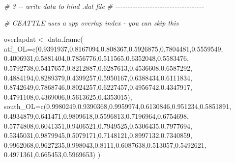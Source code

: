 \documentclass[
]{article}
\newenvironment{Shaded}{\begin{snugshade}}{\end{snugshade}}
\newcommand{\AttributeTok}[1]{\textcolor[rgb]{0.77,0.63,0.00}{#1}}
\newcommand{\CommentTok}[1]{\textcolor[rgb]{0.56,0.35,0.01}{\textit{#1}}}
\newcommand{\FloatTok}[1]{\textcolor[rgb]{0.00,0.00,0.81}{#1}}
\newcommand{\FunctionTok}[1]{\textcolor[rgb]{0.00,0.00,0.00}{#1}}
\newcommand{\NormalTok}[1]{#1}
\newcommand{\OtherTok}[1]{\textcolor[rgb]{0.56,0.35,0.01}{#1}}
\begin{document}
\begin{Shaded}
\begin{Highlighting}[]
   \CommentTok{\# 3 {-}{-} write data to hind .dat file}
   \CommentTok{\# {-}{-}{-}{-}{-}{-}{-}{-}{-}{-}{-}{-}{-}{-}{-}{-}{-}{-}{-}{-}{-}{-}{-}{-}{-}{-}{-}{-}{-}{-}{-}{-}{-}{-}{-}{-}}
      
         
      \CommentTok{\# CEATTLE uses a spp overlap index {-} you can skip this}
          
\NormalTok{                overlapdat }\OtherTok{\textless{}{-}} \FunctionTok{data.frame}\NormalTok{(}
                    \AttributeTok{atf\_OL=}\FunctionTok{c}\NormalTok{(}\FloatTok{0.9391937}\NormalTok{,}\FloatTok{0.8167094}\NormalTok{,}\FloatTok{0.808367}\NormalTok{,}\FloatTok{0.5926875}\NormalTok{,}\FloatTok{0.7804481}\NormalTok{,}\FloatTok{0.5559549}\NormalTok{,}
                             \FloatTok{0.4006931}\NormalTok{,}\FloatTok{0.5881404}\NormalTok{,}\FloatTok{0.7856776}\NormalTok{,}\FloatTok{0.511565}\NormalTok{,}\FloatTok{0.6352048}\NormalTok{,}\FloatTok{0.5583476}\NormalTok{,}
                             \FloatTok{0.5792738}\NormalTok{,}\FloatTok{0.5417657}\NormalTok{,}\FloatTok{0.8212887}\NormalTok{,}\FloatTok{0.6287613}\NormalTok{,}\FloatTok{0.4536608}\NormalTok{,}\FloatTok{0.6587292}\NormalTok{,}
                             \FloatTok{0.4884194}\NormalTok{,}\FloatTok{0.8289379}\NormalTok{,}\FloatTok{0.4399257}\NormalTok{,}\FloatTok{0.5950167}\NormalTok{,}\FloatTok{0.6388434}\NormalTok{,}\FloatTok{0.6111834}\NormalTok{,}
                             \FloatTok{0.8742649}\NormalTok{,}\FloatTok{0.7868746}\NormalTok{,}\FloatTok{0.8024257}\NormalTok{,}\FloatTok{0.6227457}\NormalTok{,}\FloatTok{0.4956742}\NormalTok{,}\FloatTok{0.4347917}\NormalTok{,}
                             \FloatTok{0.4791108}\NormalTok{,}\FloatTok{0.4369006}\NormalTok{,}\FloatTok{0.5613625}\NormalTok{,}\FloatTok{0.4353015}\NormalTok{),}
                    \AttributeTok{south\_OL=}\FunctionTok{c}\NormalTok{(}\FloatTok{0.9980249}\NormalTok{,}\FloatTok{0.9390368}\NormalTok{,}\FloatTok{0.9959974}\NormalTok{,}\FloatTok{0.6130846}\NormalTok{,}\FloatTok{0.951234}\NormalTok{,}\FloatTok{0.5851891}\NormalTok{,}
                               \FloatTok{0.4934879}\NormalTok{,}\FloatTok{0.641471}\NormalTok{,}\FloatTok{0.9809618}\NormalTok{,}\FloatTok{0.5596813}\NormalTok{,}\FloatTok{0.7196964}\NormalTok{,}\FloatTok{0.6754698}\NormalTok{,}
                               \FloatTok{0.5774808}\NormalTok{,}\FloatTok{0.6041351}\NormalTok{,}\FloatTok{0.9406521}\NormalTok{,}\FloatTok{0.7949525}\NormalTok{,}\FloatTok{0.5306435}\NormalTok{,}\FloatTok{0.7977694}\NormalTok{,}
                               \FloatTok{0.5345031}\NormalTok{,}\FloatTok{0.9879945}\NormalTok{,}\FloatTok{0.5079171}\NormalTok{,}\FloatTok{0.7148121}\NormalTok{,}\FloatTok{0.8997132}\NormalTok{,}\FloatTok{0.7340859}\NormalTok{,}
                               \FloatTok{0.9962068}\NormalTok{,}\FloatTok{0.9627235}\NormalTok{,}\FloatTok{0.998043}\NormalTok{,}\FloatTok{0.8111}\NormalTok{,}\FloatTok{0.6087638}\NormalTok{,}\FloatTok{0.513057}\NormalTok{,}\FloatTok{0.5492621}\NormalTok{,}
                               \FloatTok{0.4971361}\NormalTok{,}\FloatTok{0.665453}\NormalTok{,}\FloatTok{0.5969653}\NormalTok{)}
\NormalTok{                    )}
          

\end{Highlighting}
\end{Shaded}
\end{document}
